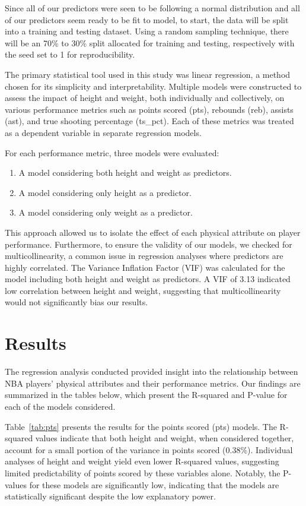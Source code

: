 \documentclass[12pt]{article}
\begin{document}
Since all of our predictors were seen to be following a normal distribution and all of our predictors seem ready to be fit
to model, to start, the data will be split into a training and testing dataset. Using a random sampling technique, there 
will be an 70\% to 30\% split allocated for training and testing, respectively with the seed set to 1 for reproducibility. 

The primary statistical tool used in this study was linear regression, a method chosen for its simplicity and interpretability. 
Multiple models were constructed to assess the impact of height and weight, both individually and collectively, on 
various performance metrics such as points scored (pts), rebounds (reb), assists (ast), and true shooting 
percentage (ts\_pct). Each of these metrics was treated as a dependent variable in separate regression models.

For each performance metric, three models were evaluated:

\begin{enumerate}
    \item A model considering both height and weight as predictors.
    \item A model considering only height as a predictor.
    \item A model considering only weight as a predictor.
\end{enumerate}

This approach allowed us to isolate the effect of each physical attribute on player performance. Furthermore, to 
ensure the validity of our models, we checked for multicollinearity, a common issue in regression analyses where 
predictors are highly correlated. The Variance Inflation Factor (VIF) was calculated for the model including both 
height and weight as predictors. A VIF of 3.13 indicated low correlation between height and weight, suggesting 
that multicollinearity would not significantly bias our results.

\section{Results}
\label{sec:resu}

The regression analysis conducted provided insight into the relationship between NBA players' physical attributes 
and their performance metrics. Our findings are summarized in the tables below, which present the R-squared 
and P-value for each of the models considered.

Table~\ref{tab:pts} presents the results for the points scored (pts) models. The R-squared values indicate that 
both height and weight, when considered together, account for a small portion of the variance in points scored (0.38\%). 
Individual analyses of height and weight yield even lower R-squared values, suggesting limited predictability of 
points scored by these variables alone. Notably, the P-values for these models are significantly low, indicating 
that the models are statistically significant despite the low explanatory power.
\end{document}
